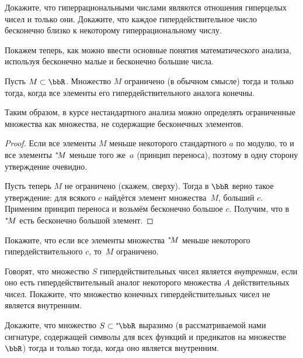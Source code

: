 \begin{problem}
Докажите, что гиперрациональными числами являются отношения
гиперцелых чисел и только они.
Докажите, что каждое гипердействительное число бесконечно близко
к некоторому гиперрациональному числу.
\end{problem}

Покажем теперь, как можно ввести
основные понятия математического анализа, используя бесконечно
малые и бесконечно большие числа.

\begin{theorem}
Пусть $M\subset\bbR$. Множество $M$ ограничено (в обычном смысле)
тогда и только тогда, когда все элементы
его гипердействительного аналога конечны.
\end{theorem}

Таким образом, в курсе нестандартного анализа можно определять
ограниченные множества как множества, не содержащие бесконечных
элементов.

\begin{proof}
Если все элементы $M$ меньше некоторого стандартного $a$ по модулю,
то и все элементы ${}^*\!M$ меньше того же~$a$ (принцип переноса),
поэтому в одну сторону утверждение очевидно.

Пусть теперь $M$ не ограничено (скажем, сверху). Тогда в $\bbR$
верно такое утверждение: для всякого $c$ найдётся элемент
множества~$M$, больший $c$. Применим принцип переноса и возьмём
бесконечно большое $c$. Получим, что в~${}^*\!M$ есть бесконечно
большой элемент.
\end{proof}

\begin{problem}
Покажите, что если все элементы множества ${}^*\!M$ меньше некоторого
гипердействительного $c$, то~$M$ ограничено.
\end{problem}

\begin{problem}
Говорят, что множество $S$ гипердействительных чисел является
\emph{внутренним},%
%
если оно есть гипердействительный аналог
некоторого множества $A$ действительных чисел. Покажите, что
множество конечных гипердействительных чисел не является
внутренним.
\end{problem}

\begin{problem}
Докажите, что множество $S\subset\nstR$ выразимо (в рассматриваемой
нами сигнатуре, содержащей символы для всех функций и предикатов
на множестве~$\bbR$) тогда и только тогда, когда оно является
внутренним.
\end{problem}

